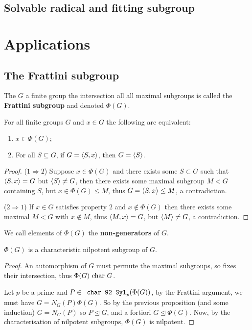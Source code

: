 \documentclass{article}
\begin{document}
\subsection{Solvable radical and fitting subgroup}

\section{Applications}

\subsection{The Frattini subgroup}

\begin{definition}
    The $G$ a finite group the intersection all all maximal subgroups is called the \textbf{Frattini subgroup} and denoted $\Phi(G)$.
\end{definition}

\begin{proposition}
    For all finite groups $G$ and $x\in G$ the following are equivalent: \begin{enumerate}
        \item $x\in \Phi(G)$;
        \item For all $S\subseteq G$, if $G=\left\langle S,x \right\rangle$, then $G=\left\langle S \right\rangle$.
    \end{enumerate}
    \begin{proof}
        ($1\Rightarrow 2$) Suppose $x\in\Phi(G)$ and there exists some $S\subset G$ such that $\left\langle S,x \right\rangle=G$ but $\left\langle S \right\rangle\neq G$, then there exists some maximal subgroup $M< G$ containing $S$, but $x\in\Phi(G)\leq M$, thus $G=\left\langle S,x \right\rangle\leq M$, a contradiction.

        ($2\Rightarrow 1$) If $x\in G$ satisfies property $2$ and $x\notin\Phi(G)$ then there exists some maximal $M<G$ with $x\notin M$, thus $\left\langle M,x \right\rangle=G$, but $\left\langle M \right\rangle\neq G$, a contradiction.
    \end{proof}
\end{proposition}

We call elements of $\Phi(G)$ the \textbf{non-generators} of $G$.

\begin{proposition}
    $\Phi(G)$ is a characteristic nilpotent subgroup of $G$.
    \begin{proof}
        An automorphism of $G$ must permute the maximal subgroups, so fixes their intersection, thus $\Phi(G)\text{ char } G$.

        Let $p$ be a prime and $P\in\Syl_p(\Phi(G))$, by the Frattini argument, we must have $G=N_G(P)\Phi(G)$. So by the previous proposition (and some induction) $G=N_G(P)$ so $P\unlhd G$, and a fortiori $G\unlhd\Phi(G)$. Now, by the characterisation of nilpotent subgroups, $\Phi(G)$ is nilpotent.
    \end{proof}
\end{proposition}
\end{document}
